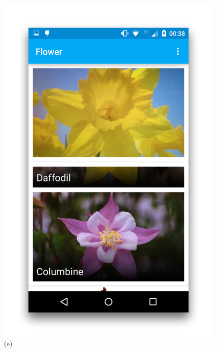 \documentclass[11pt, a4paper]{report}
\begin{document}
\begin{figure}[h]
\begin{minipage}[b]{0.2\linewidth}
	\includegraphics[totalheight=6cm]{img/43.png}
	(e)
\end{minipage}
\begin{minipage}[b]{0.2\linewidth}
	\centering

\end{minipage}
\end{figure}
\end{document}
